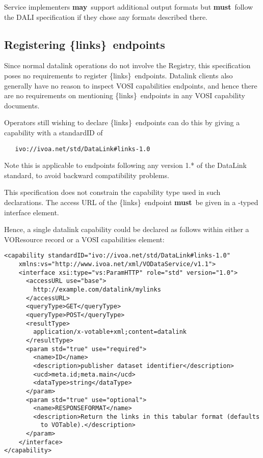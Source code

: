 \documentclass[11pt,a4paper]{ivoa}
\newcommand{\blinks}{\{links\}}
\newcommand{\rfcmust}{\textbf{must}}
\newcommand{\rfcmay}{\textbf{may}}
\begin{document}
Service implementers \rfcmay\ support additional output formats but \rfcmust\ follow
the DALI specification if they chose any formats described there.


\subsection{Registering \blinks\ endpoints}

Since normal datalink operations do not involve the Registry, this
specification poses no requirements to register \blinks\ endpoints.
Datalink clients also generally have no reason to inspect VOSI
capabilities endpoints, and hence there are no requirements on
mentioning \blinks\ endpoints in any VOSI capability documents.

Operators still wishing to declare \blinks\ endpoints can do this by
giving a capability with a standardID of
\begin{verbatim}
   ivo://ivoa.net/std/DataLink#links-1.0
\end{verbatim}
Note this is applicable to endpoints following any version 1.*
of the DataLink standard, to avoid backward compatibility problems.

This specification does not constrain the capability type used in such
declarations.  The access URL of the \blinks\ endpoint \rfcmust\ be given in a
-typed interface element.

Hence, a single datalink capability could be declared as follows within
either a VOResource record or a VOSI capabilities element:

\begin{verbatim}
<capability standardID="ivo://ivoa.net/std/DataLink#links-1.0"
    xmlns:vs="http://www.ivoa.net/xml/VODataService/v1.1">
    <interface xsi:type="vs:ParamHTTP" role="std" version="1.0">
      <accessURL use="base">
        http://example.com/datalink/mylinks
      </accessURL>
      <queryType>GET</queryType>
      <queryType>POST</queryType>
      <resultType>
        application/x-votable+xml;content=datalink
      </resultType>
      <param std="true" use="required">
        <name>ID</name>
        <description>publisher dataset identifier</description>
        <ucd>meta.id;meta.main</ucd>
        <dataType>string</dataType>
      </param>
      <param std="true" use="optional">
        <name>RESPONSEFORMAT</name>
        <description>Return the links in this tabular format (defaults
          to VOTable).</description>
      </param>
    </interface>
</capability>
\end{verbatim}
\end{document}

